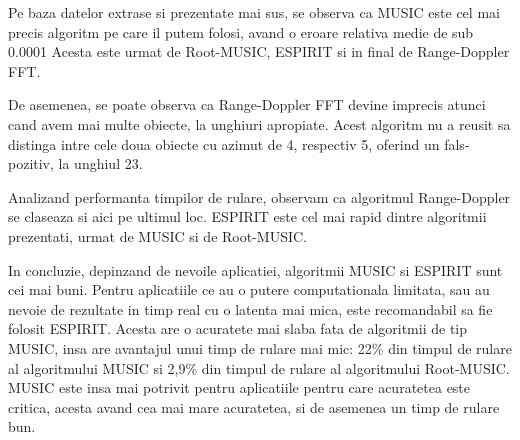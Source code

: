 \documentclass{article}
\begin{document}
Pe baza datelor extrase si prezentate mai sus, se observa ca MUSIC este cel mai precis algoritm pe care il putem folosi, avand o eroare relativa medie de sub 0.0001%
Acesta este urmat de Root-MUSIC, ESPIRIT si in final de Range-Doppler FFT.

De asemenea, se poate observa ca Range-Doppler FFT devine imprecis atunci cand avem mai multe obiecte, la unghiuri apropiate.
Acest algoritm nu a reusit sa distinga intre cele doua obiecte cu azimut de 4, respectiv 5, oferind un fals-pozitiv, la unghiul 23.

Analizand performanta timpilor de rulare, observam ca algoritmul Range-Doppler se claseaza si aici pe ultimul loc.
ESPIRIT este cel mai rapid dintre algoritmii prezentati, urmat de MUSIC si de Root-MUSIC.

In concluzie, depinzand de nevoile aplicatiei, algoritmii MUSIC si ESPIRIT sunt cei mai buni.
Pentru aplicatiile ce au o putere computationala limitata, sau au nevoie de rezultate in timp real cu o latenta mai mica, este recomandabil sa fie folosit ESPIRIT.
Acesta are o acuratete mai slaba fata de algoritmii de tip MUSIC, insa are avantajul unui timp de rulare mai mic: 22\% din timpul de rulare al algoritmului MUSIC si 2,9\% din timpul de rulare al algoritmului Root-MUSIC.
MUSIC este insa mai potrivit pentru aplicatiile pentru care acuratetea este critica, acesta avand cea mai mare acuratetea, si de asemenea un timp de rulare bun.

\printbibliography
\end{document}
